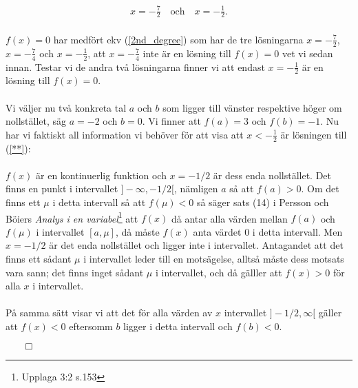 \documentclass{article}
\begin{document}
\begin{gather*}
  x = -\frac{7}{2} \quad \text{och} \quad x = - \frac{1}{2}\text{.}
\end{gather*}
\\
$f(x) = 0$ har medfört ekv (\ref{2nd_degree}) som har de tre lösningarna $x = -\tfrac{7}{2}$, $x = -\tfrac{7}{4}$ och $x = -\tfrac{1}{2}$, att $x = -\tfrac{7}{4}$ inte är en lösning till $f(x) = 0$ vet vi sedan innan. Testar vi de andra två lösningarna finner vi att endast $x = -\tfrac{1}{2}$ är en lösning till $f(x) = 0$.
\\
\\
Vi väljer nu två konkreta tal $a$ och $b$ som ligger till vänster respektive höger om nollstället, säg $a = -2$ och $b = 0$. Vi finner att $f(a) = 3$ och $f(b) = -1$. Nu har vi faktiskt all information vi behöver för att visa att $x < -\tfrac{1}{2}$ är lösningen till (\ref{**}):
\\
\\
$f(x)$ är en kontinuerlig funktion och $x = -1/2$ är dess enda nollstället. Det finns en punkt i intervallet $]-\infty, -1/2[$, nämligen $a$ så att $f(a) > 0$. Om det finns ett $\mu$ i detta intervall så att $f(\mu) < 0$ så säger sats (14) i Persson och Böiers \emph{Analys i en variabel}\footnote{Upplaga 3:2 s.153} att $f(x)$ då antar alla värden mellan $f(a)$ och $f(\mu)$ i intervallet $[a, \mu]$, då måste $f(x)$ anta värdet $0$ i detta intervall. Men $x = -1/2$ är det enda nollstället och ligger inte i intervallet. Antagandet att det finns ett sådant $\mu$ i intervallet leder till en motsägelse, alltså måste dess motsats vara sann; det finns inget sådant $\mu$ i intervallet, och då gälller att $f(x) > 0$ för alla $x$ i intervallet.
\\
\\På samma sätt visar vi att det för alla värden av $x$ intervallet $ ]-1/2, \infty[$ gäller att $f(x) < 0$ eftersomm $b$ ligger i detta intervall och $f(b) < 0$.

\centerline{$\qed$}
\end{document}
